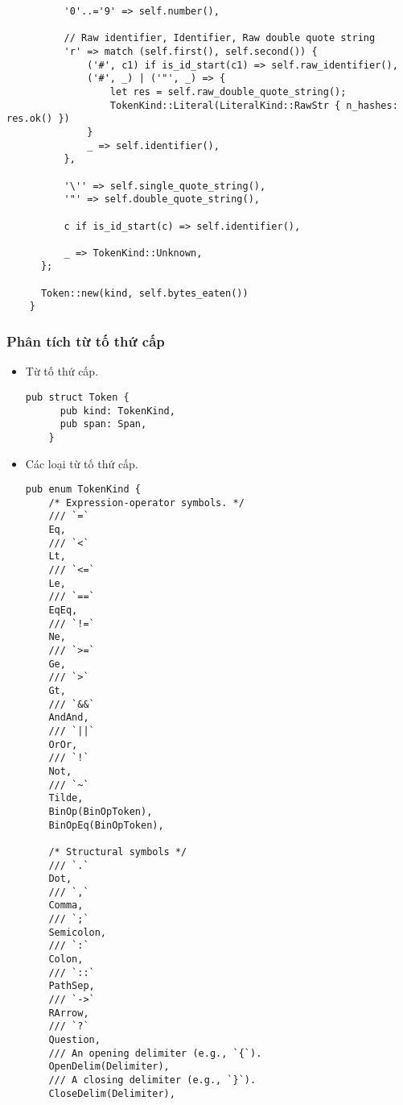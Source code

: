 {\begin{itemize}
\begin{lstlisting}
          '0'..='9' => self.number(),

          // Raw identifier, Identifier, Raw double quote string
          'r' => match (self.first(), self.second()) {
              ('#', c1) if is_id_start(c1) => self.raw_identifier(),
              ('#', _) | ('"', _) => {
                  let res = self.raw_double_quote_string();
                  TokenKind::Literal(LiteralKind::RawStr { n_hashes: res.ok() })
              }
              _ => self.identifier(),
          },

          '\'' => self.single_quote_string(),
          '"' => self.double_quote_string(),

          c if is_id_start(c) => self.identifier(),

          _ => TokenKind::Unknown,
      };

      Token::new(kind, self.bytes_eaten())
    }
  \end{lstlisting}
\end{itemize}

\subsubsection{Phân tích từ tố thứ cấp}
\begin{itemize}
  \item \label{ap1:flex_token}Từ tố thứ cấp. %
  \begin{lstlisting}[]
    pub struct Token {
      pub kind: TokenKind,
      pub span: Span,
    }
  \end{lstlisting}
  \item \label{ap1:flex_token_kind}Các loại từ tố thứ cấp.
\begin{lstlisting}
pub enum TokenKind {
    /* Expression-operator symbols. */
    /// `=`
    Eq,
    /// `<`
    Lt,
    /// `<=`
    Le,
    /// `==`
    EqEq,
    /// `!=`
    Ne,
    /// `>=`
    Ge,
    /// `>`
    Gt,
    /// `&&`
    AndAnd,
    /// `||`
    OrOr,
    /// `!`
    Not,
    /// `~`
    Tilde,
    BinOp(BinOpToken),
    BinOpEq(BinOpToken),
    
    /* Structural symbols */
    /// `.`
    Dot,
    /// `,`
    Comma,
    /// `;`
    Semicolon,
    /// `:`
    Colon,
    /// `::`
    PathSep,
    /// `->`
    RArrow,
    /// `?`
    Question,
    /// An opening delimiter (e.g., `{`).
    OpenDelim(Delimiter),
    /// A closing delimiter (e.g., `}`).
    CloseDelim(Delimiter),
    

\end{lstlisting}
\end{itemize}}
